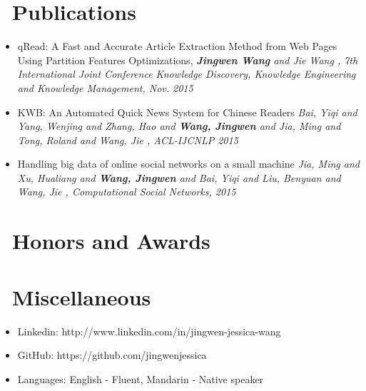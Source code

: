 \documentclass{resume}
\begin{document}
\section{\faBook \ Publications}

\begin{itemize}
  \item qRead: A Fast and Accurate Article Extraction Method from Web Pages Using Partition Features Optimizations,
  \textit{\textbf{Jingwen Wang} and Jie Wang
  , 7th International Joint Conference Knowledge Discovery, Knowledge Engineering and Knowledge Management, Nov. 2015}
  \item KWB: An Automated Quick News System for Chinese Readers
  \textit{Bai, Yiqi and Yang, Wenjing and Zhang, Hao and \textbf{Wang, Jingwen} and Jia, Ming and Tong, Roland and Wang, Jie
  , ACL-IJCNLP 2015}
  \item Handling big data of online social networks on a small machine
  \textit{Jia, Ming and Xu, Hualiang and \textbf{Wang, Jingwen} and Bai, Yiqi and Liu, Benyuan and Wang, Jie
  , Computational Social Networks, 2015}
\end{itemize}



\section{\faHeartO\ Honors and Awards}




\section{\faInfo\ Miscellaneous}
\begin{itemize}[parsep=0.5ex]
  \item Linkedin: http://www.linkedin.com/in/jingwen-jessica-wang
  \item GitHub: https://github.com/jingwenjessica
  \item Languages: English - Fluent, Mandarin - Native speaker
\end{itemize}

\newpage


\end{document}
